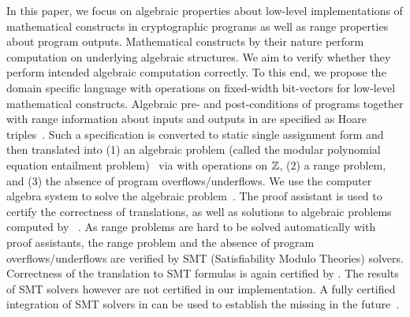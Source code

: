In this paper, we focus on algebraic properties about low-level
implementations of mathematical constructs in cryptographic programs
as well as range properties about program outputs.
Mathematical constructs by their nature perform computation on
underlying algebraic structures. We aim to verify whether they perform
intended algebraic computation correctly. To this end, we propose the
domain specific language \bvdsl with operations on fixed-width bit-vectors for low-level
mathematical constructs. Algebraic pre- and post-conditions of
programs together with range information about inputs and outputs in \bvdsl are specified as Hoare
triples~\cite{H:69:ABCP}.
Such a specification is converted to static single
assignment form and then translated into (1) an algebraic problem (called
the modular polynomial equation entailment
problem)~\cite{AWZ:88:DQVP,H:07:AENTP} via \zdsl with operations on $\mathbb{Z}$, (2) a range problem, and (3) the absence of program overflows/underflows. We use the computer
algebra system \singular to solve the algebraic problem~\cite{GP:08:SICA}.
The proof assistant \coq is used to certify the
correctness of translations, as well as solutions to algebraic
problems computed by \singular~\cite{YC:2004:ITPPDC}.
As range problems are hard to be solved automatically with proof assistants, the range problem and the absence of program overflows/underflows are verified by SMT (Satisfiability Modulo Theories) solvers.
Correctness of the translation to SMT formulas is again certified by
\coq. The results of SMT solvers however are not certified in our
implementation. A fully certified integration of SMT solvers in \coq
can be used to establish the missing in the future~\cite{EMT+:17:SPISS}.


